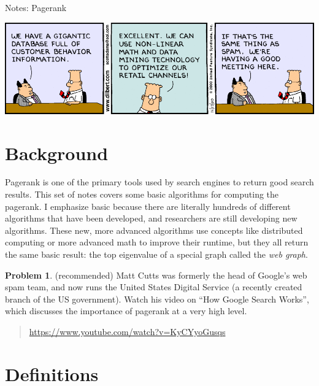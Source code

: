 \documentclass[10pt]{article}
\theoremstyle{definition}
\newtheorem{problem}{Problem}
\begin{document}
\begin{center}
{
\Huge
Notes: Pagerank
}

\end{center}

\begin{center}
\includegraphics[width=\textwidth]{dilbert}
\end{center}

\section{Background}

Pagerank is one of the primary tools used by search engines to return good search results.
This set of notes covers some basic algorithms for computing the pagerank.
I emphasize basic because there are literally hundreds of different algorithms that have been developed,
and researchers are still developing new algorithms.
These new, more advanced algorithms use concepts like distributed computing or more advanced math to improve their runtime,
but they all return the same basic result:
the top eigenvalue of a special graph called the \emph{web graph}.

\begin{problem}
    (recommended)
    Matt Cutts was formerly the head of Google's web spam team,
    and now runs the United States Digital Service (a recently created branch of the US government).
    Watch his video on ``How Google Search Works'', which discusses the importance of pagerank at a very high level.
    \begin{quote}
    \url{https://www.youtube.com/watch?v=KyCYyoGusqs}
    \end{quote}
\end{problem}

\section{Definitions}
\end{document}
